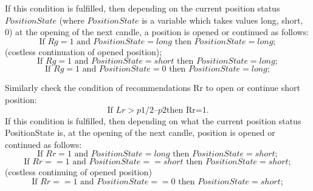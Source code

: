 \documentclass[runningheads,a4paper]{llncs}
\begin{document}
If this condition is fulfilled, then depending on the current position status $PositionState$ (where $PositionState$ is a variable which takes values {long, short, 0}) at the opening of the next candle, a position is opened or continued as follows: 
\begin{equation}
\text{If } Rg=1 \text{ and } PositionState =long \text{ then }PositionState =long;
\end{equation}
(costless continuation of opened position);
\begin{equation}
\text{If } Rg=1 \text{ and } PositionState = short \text{ then } PositionState=long;
\end{equation}
\begin{equation}
\text{If } Rg=1 \text{ and } PositionState =0 \text{ then } PositionState =long;
\end{equation}

Similarly check the condition of recommendations Rr to open or continue short position:
\begin{equation}
\text{If } Lr>p1/2 – p2 \text {then Rr=1.}
\end{equation}
If this condition is fulfilled, then depending on what the current position status PositionState is, at the opening of the next candle, position is opened or continued as follows: \\
\begin{equation}
\text{If } Rr=1 \text{ and } PositionState =long \text{ then } PositionState =short;
\end{equation}
\begin{equation}
\text{If } Rr==1 \text{ and } PositionState ==short \text{ then } PositionState=short;
\end{equation}
(costless continuing of opened position)
\begin{equation}
\text{If } Rr==1 \text{ and }  PositionState ==0 \text{ then }  PositionState =short;
\end{equation}
\end{document}
